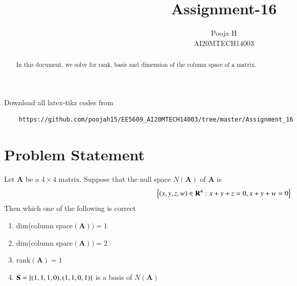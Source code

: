 \documentclass[journal,12pt,twocolumn]{IEEEtran}
\begin{document}
	\makeatother
	\let\StandardTheFigure\thefigure
	\let\vec\mathbf
	\renewcommand{\thefigure}{\theproblem}
	\def\putbox#1#2#3{\makebox[0in][l]{\makebox[#1][l]{}\raisebox{\baselineskip}[0in][0in]{\raisebox{#2}[0in][0in]{#3}}}}
	\def\rightbox#1{\makebox[0in][r]{#1}}
	\def\centbox#1{\makebox[0in]{#1}}
	\def\topbox#1{\raisebox{-\baselineskip}[0in][0in]{#1}}
	\def\midbox#1{\raisebox{-0.5\baselineskip}[0in][0in]{#1}}
	\vspace{3cm}
	\title{Assignment-16}
	\author{Pooja H \\ AI20MTECH14003}
	\maketitle
	\newpage
	\bigskip
	\renewcommand{\thefigure}{\theenumi}
	\renewcommand{\thetable}{\theenumi}
	\begin{abstract}
		In this document, we solve for rank, basis and dimension of the column space of a matrix.
	\end{abstract}
	Download all latex-tikz codes from 
\begin{lstlisting}
	https://github.com/poojah15/EE5609_AI20MTECH14003/tree/master/Assignment_16
\end{lstlisting}
	\section{Problem Statement}
	Let $\vec{A}$ be a $4 \times 4$ matrix. Suppose that the null space $N(\vec{A})$ of $\vec{A}$ is
	\begin{align}
		\cbrak{(x,y,z,w) \in \vec{R}^4 : x + y + z = 0 , x + y + w = 0}
	\end{align}
Then which one of the following is correct
\begin{enumerate}
\item  dim(column space$(\vec{A})) = 1$ 
\item dim(column space$(\vec{A})) = 2$
\item rank$(\vec{A}) = 1$
\item $\vec{S}= \cbrak{(1, 1, 1, 0), (1, 1, 0, 1)}$ is a basis of $N(\vec{A})$
\end{enumerate}
\end{document}
